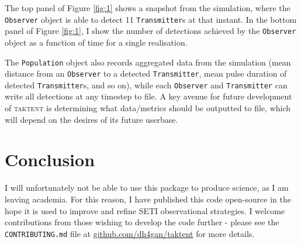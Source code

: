 \documentclass[RNAAS]{aastex62}
\begin{document}
The top panel of Figure \ref{fig:1} shows a snapshot from the simulation, where the \texttt{Observer} object is able to detect 11 \texttt{Transmitter}s at that instant.  In the bottom panel of Figure \ref{fig:1}, I show the number of detections achieved by the \texttt{Observer} object as a function of time for a single realisation.  

The \texttt{Population} object also records aggregated data from the simulation (mean distance from an \texttt{Observer} to a detected \texttt{Transmitter}, mean pulse duration of detected \texttt{Transmitter}s, and so on), while each \texttt{Observer} and \texttt{Transmitter} can write all detections at any timestep to file.  A key avenue for future development of \textsc{taktent} is determining what data/metrics should be outputted to file, which will depend on the desires of its future userbase.

\section{Conclusion}

\noindent I will unfortunately not be able to use this package to produce science, as I am leaving academia.  For this reason, I have published this code open-source in the hope it is used to improve and refine SETI observational strategies.  I welcome contributions from those wishing to develop the code further - please see the \texttt{CONTRIBUTING.md} file at \url{github.com/dh4gan/taktent} for more details.



\acknowledgments



\end{document}
